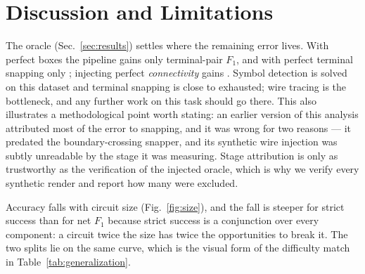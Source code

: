 \section{Discussion and Limitations}
\label{sec:discussion}


The oracle (Sec.~\ref{sec:results}) settles where the remaining error
lives. With perfect boxes the pipeline gains only \OracleDetection{}
terminal-pair $F_1$, and with perfect terminal snapping only
\OracleSnapping{}; injecting perfect \emph{connectivity} gains
\OracleWires{}. Symbol detection is solved on this dataset and terminal
snapping is close to exhausted; wire tracing is the bottleneck, and any
further work on this task should go there. This also illustrates a
methodological point worth stating: an earlier version of this analysis
attributed most of the error to snapping, and it was wrong for two
reasons — it predated the boundary-crossing snapper, and its synthetic
wire injection was subtly unreadable by the stage it was measuring.
Stage attribution is only as trustworthy as the verification of the
injected oracle, which is why we verify every synthetic render and
report how many were excluded.


Accuracy falls with circuit size (Fig.~\ref{fig:size}), and the fall is
steeper for strict success than for net $F_1$ because strict success is a
conjunction over every component: a circuit twice the size has twice the
opportunities to break it. The two splits lie on the same curve, which is
the visual form of the difficulty match in
Table~\ref{tab:generalization}.

